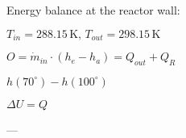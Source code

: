 Energy balance at the reactor wall:  

\( T_{in} = 288.15 \, \text{K}, \, T_{out} = 298.15 \, \text{K} \)  

\( O = \dot{m}_{in} \cdot (h_e - h_a) = Q_{out} + Q_R \)  

\( h(70^\circ) - h(100^\circ) \)  

\( \Delta U = Q \)  

---